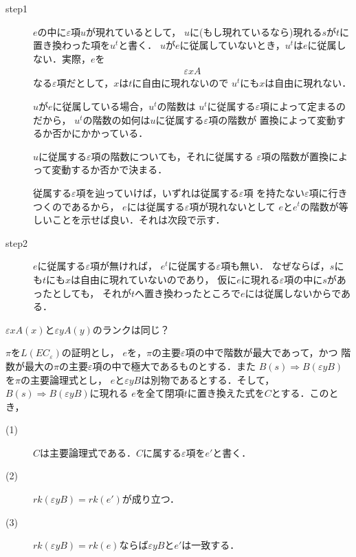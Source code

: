 	\begin{metaprf}\mbox{}
		\begin{description}
			\item[step1]
				$e$の中に$\varepsilon$項$u$が現れているとして，
				$u$に(もし現れているなら)現れる$s$が$t$に置き換わった項を$u^{t}$と書く．
				$u$が$e$に従属していないとき，$u^{t}$は$e$に従属しない．実際，$e$を
				\begin{align}
					\varepsilon x A
				\end{align}
				なる$\varepsilon$項だとして，$x$は$t$に自由に現れないので
				$u^{t}$にも$x$は自由に現れない．
				
				$u$が$e$に従属している場合，$u^{t}$の階数は
				$u^{t}$に従属する$\varepsilon$項によって定まるのだから，
				$u^{t}$の階数の如何は$u$に従属する$\varepsilon$項の階数が
				置換によって変動するか否かにかかっている．
				
				$u$に従属する$\varepsilon$項の階数についても，それに従属する
				$\varepsilon$項の階数が置換によって変動するか否かで決まる．
				
				従属する$\varepsilon$項を辿っていけば，いずれは従属する$\varepsilon$項
				を持たない$\varepsilon$項に行きつくのであるから，
				$e$には従属する$\varepsilon$項が現れないとして
				$e$と$e^{t}$の階数が等しいことを示せば良い．それは次段で示す．
				
			\item[step2]
				$e$に従属する$\varepsilon$項が無ければ，
				$e^{t}$に従属する$\varepsilon$項も無い．
				なぜならば，$s$にも$t$にも$x$は自由に現れていないのであり，
				仮に$e$に現れる$\varepsilon$項の中に$s$があったとしても，
				それが$t$へ置き換わったところで$e$には従属しないからである．
				\QED
		\end{description}
	\end{metaprf}
	
	$\varepsilon x A(x)$と$\varepsilon y A(y)$のランクは同じ？
	
	\begin{screen}
		\begin{metathm}[置換定理]
			$\pi$を$L(EC_{\varepsilon})$の証明とし，
			$e$を，$\pi$の主要$\varepsilon$項の中で階数が最大であって，かつ
			階数が最大の$\pi$の主要$\varepsilon$項の中で極大であるものとする．また
			$B(s) \Longrightarrow B(\varepsilon y B)$を$\pi$の主要論理式とし，
			$e$と$\varepsilon y B$は別物であるとする．そして，$B(s) \Longrightarrow B(\varepsilon y B)$に現れる
			$e$を全て閉項$t$に置き換えた式を$C$とする．このとき，
			\begin{description}
				\item[(1)] $C$は主要論理式である．$C$に属する$\varepsilon$項を$e'$と書く．
				\item[(2)] $rk(\varepsilon y B) = rk(e')$が成り立つ．
				\item[(3)] $rk(\varepsilon y B) = rk(e)$ならば$\varepsilon y B$と$e'$は一致する．
			\end{description}
		\end{metathm}
	\end{screen}
	
